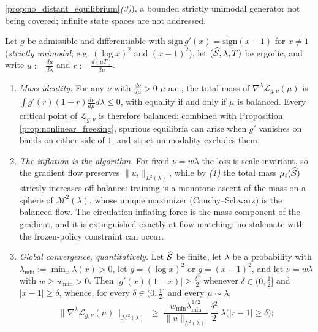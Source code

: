 \begin{remark}
\ref{prop:no_distant_equilibrium}\emph{(3)}), a bounded strictly unimodal generator not being covered; infinite state spaces are not addressed.
\end{remark}

\begin{proposition}\label{prop:no_distant_equilibrium}
Let $g$ be admissible and differentiable with $\mathrm{sign}\,g'(x)=\mathrm{sign}(x-1)$ for $x\neq1$ (\emph{strictly unimodal}; e.g. $(\log x)^2$ and $(x-1)^2$), let $(\widehat{\mathcal S},\lambda,T)$ be ergodic, and write $u:=\frac{d\mu}{d\lambda}$ and $r:=\frac{d(\mu T)}{d\mu}$.
\begin{enumerate}
    \item \emph{Mass identity.} For any $\nu$ with $\frac{d\nu}{d\mu}>0$ $\mu$-a.e., the total mass of $\nabla^{\lambda}\mathcal L_{g,\nu}(\mu)$ is $\int g'(r)(1-r)\frac{d\nu}{d\mu}d\lambda\leq0$, with equality if and only if $\mu$ is balanced. Every critical point of $\mathcal L_{g,\nu}$ is therefore balanced: combined with Proposition \ref{prop:nonlinear_freezing}, spurious equilibria can arise when $g'$ vanishes on bands on either side of $1$, and strict unimodality excludes them.
    \item \emph{The inflation is the algorithm.} For fixed $\nu=w\lambda$ the loss is scale-invariant, so the gradient flow preserves $\|u_t\|_{L^2(\lambda)}$, while by \emph{(1)} the total mass $\mu_t(\widehat{\mathcal S})$ strictly increases off balance: training is a monotone ascent of the mass on a sphere of $\mathcal M^2(\lambda)$, whose unique maximizer (Cauchy--Schwarz) is the balanced flow. The circulation-inflating force is the mass component of the gradient, and it is extinguished exactly at flow-matching: no stalemate with the frozen-policy constraint can occur.
    \item \emph{Global convergence, quantitatively.} Let $\widehat{\mathcal S}$ be finite, let $\lambda$ be a probability with $\lambda_{\min}:=\min_{x}\lambda(x)>0$, let $g=(\log x)^2$ or $g=(x-1)^2$, and let $\nu=w\lambda$ with $w\geq w_{\min}>0$. Then $|g'(x)(1-x)|\geq\frac{\delta^2}2$ whenever $\delta\in(0,\frac12]$ and $|x-1|\geq\delta$, whence, for every $\delta\in(0,\frac12]$ and every $\mu\sim\lambda$,
    \begin{equation*}
        \bigl\|\nabla^{\lambda}\mathcal L_{g,\nu}(\mu)\bigr\|_{\mathcal M^2(\lambda)}\;\geq\;\frac{w_{\min}\lambda_{\min}^{1/2}}{\|u\|_{L^2(\lambda)}}\,\frac{\delta^2}2\;\lambda\bigl(|r-1|\geq\delta\bigr);

\end{equation*}
\end{enumerate}
\end{proposition}
